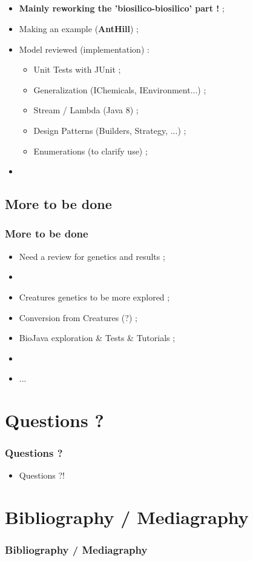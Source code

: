 \documentclass{beamer}
\begin{document}
\subsection{ \titleSubSectionThirdPartTwo }
\begin{frame}
	\frametitle{ \titleSubSectionThirdPartTwo }
	\begin{itemize}
		\item \textbf{Mainly reworking the 'biosilico-biosilico' part !} ; 
		\item Making an example (\textbf{AntHill}) ; 
		\item Model reviewed (implementation) : 
		\begin{itemize}
			\item Unit Tests with JUnit ; 
			\item Generalization (IChemicals, IEnvironment...) ; 
			\item Stream / Lambda (Java 8) ; 
			\item Design Patterns (Builders, Strategy, ...) ; 
			\item Enumerations (to clarify use) ; 
		\end{itemize}
		\item[] 
	\end{itemize}
\end{frame}

\def\titleSubSectionThirdPartThree{ More to be done }
\subsection{ \titleSubSectionThirdPartThree }
\begin{frame}
	\frametitle{ \titleSubSectionThirdPartThree }
	\begin{itemize}
		\item Need a review for genetics and results ; 
		\item[] 
		\item Creatures genetics to be more explored ; 
		\item Conversion from Creatures (?) ; 
		\item BioJava exploration \& Tests \& Tutorials ; 
		\item[] 
		\item ... 
	\end{itemize}
\end{frame}


\def\sectionPartQuestions{Questions ?}
\section{\sectionPartQuestions}
\begin{frame}
	\frametitle{\sectionPartQuestions}
	\begin{itemize}
		\item Questions ?!
	\end{itemize}
\end{frame}

\def\sectionPartBibliographie{Bibliography / Mediagraphy}
\section{\sectionPartBibliographie}
\begin{frame}
	\frametitle{\sectionPartBibliographie}
	\nocite{*}
	
	
\end{frame}
\end{document}

